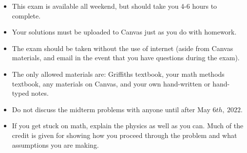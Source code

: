 \documentclass[fleqn]{article}
\begin{document}
  \begin{itemize}
    \item This exam is available all weekend, but should take you 4-6 hours to complete.
    \item Your solutions must be uploaded to Canvas just as you do with homework.
    \item The exam should be taken without the use of internet (aside from Canvas materials, and email
    in the event that you have questions during the exam).
    \item The only allowed materials are: Griffiths textbook, your math methods textbook, any materials
    on Canvas, and your own hand-written or hand-typed notes.
    \item Do not discuss the midterm problems with anyone until after May $6th, ~ 2022$.
    \item If you get stuck on math, explain the physics as well as you can.  Much of the credit is given 
    for showing how you proceed through the problem and what assumptions you are making.
  \end{itemize}

  \pagebreak
\end{document}
